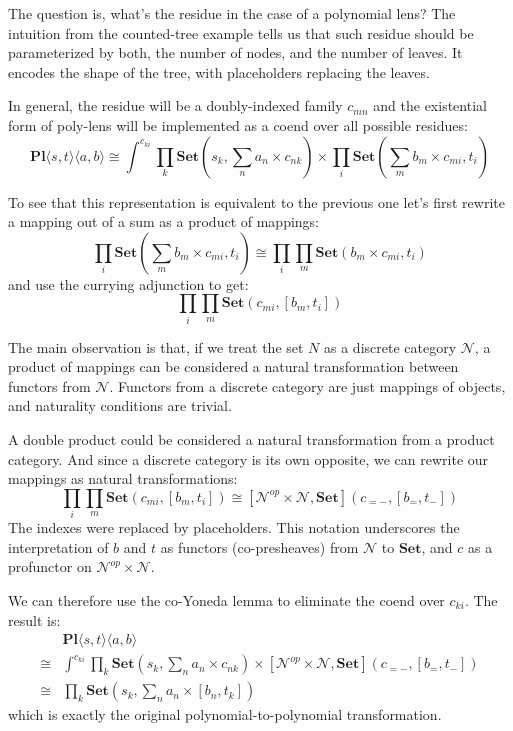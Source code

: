 \documentclass[11pt]{amsart}
\begin{document}
The question is, what's the residue in the case of a polynomial lens? The intuition from the counted-tree example tells us that such residue should be parameterized by both, the number of nodes, and the number of leaves. It encodes the shape of the tree, with placeholders replacing the leaves. 

In general, the residue will be a doubly-indexed family $c_{m n}$ and the existential form of poly-lens will be implemented as a coend over all possible residues:
\[ \mathbf{Pl}\langle s, t\rangle \langle a, b\rangle \cong \int^{c_{k i}} 
 \prod_k \mathbf{Set} \left(s_k,  \sum_n a_n \times c_{n k} \right) \times 
 \prod_i  \mathbf{Set} \left(\sum_m b_m \times c_{m i}, t_i \right) \]

To see that this representation is equivalent to the previous one let's first rewrite a mapping out of a sum as a product of mappings:
\[ \prod_i  \mathbf{Set} \left(\sum_m b_m \times c_{m i}, t_i \right) \cong 
\prod_i \prod_m \mathbf{Set}\left(b_m \times c_{m i}, t_i \right)\]
and use the currying adjunction to get:
\[ \prod_i \prod_m \mathbf{Set}\left(c_{m i}, [b_m, t_i ]\right)\]

The main observation is that, if we treat the set $N$ as a discrete category $\mathcal{N}$, a product of mappings can be considered a natural transformation between functors from $\mathcal{N}$. Functors from a discrete category are just mappings of objects, and naturality conditions are trivial. 


A double product could be considered a natural transformation from a product category. And since a discrete category is its own opposite, we can rewrite our mappings as natural transformations:
\[ \prod_i \prod_m \mathbf{Set} \left(c_{m i}, [b_m, t_i] \right) \cong 
[\mathcal{N}^{op} \times \mathcal{N}, \mathbf{Set}]\left(c_{= -}, [b_=, t_- ]\right)\]
The indexes were replaced by placeholders. This notation underscores the interpretation of $b$ and $t$ as functors (co-presheaves) from $\mathcal{N}$ to $\mathbf{Set}$, and $c$ as a profunctor on $\mathcal{N}^{op} \times \mathcal{N}$.

 
 We can therefore use the co-Yoneda lemma to eliminate the coend over $c_{ki}$. The result is:
 \begin{align*}
 &\mathbf{Pl}\langle s, t\rangle \langle a, b\rangle
 \\
\cong & \int^{c_{k i}} 
 \prod_k \mathbf{Set} \left(s_k,  \sum_n a_n \times c_{n k} \right) \times 
 [\mathcal{N}^{op} \times \mathcal{N}, \mathbf{Set}]\left(c_{= -}, [b_=, t_- ]\right) 
\\
\cong & \prod_k \mathbf{Set}\left(s_k, \sum_n a_n \times [b_n, t_k] \right)
 \end{align*}
which is exactly the original polynomial-to-polynomial transformation.
\end{document}
